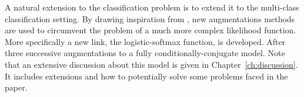 



\graphicspath{{4/figures/}}

A natural extension to the classification problem is to extend it to the multi-class classification setting.
By drawing inspiration from \citet{donner2018efficientdensity}, new augmentations methods are used to circumvent the problem of a much more complex likelihood function.
More specifically a new link, the logistic-softmax function, is developed.
After three successive augmentations to a fully conditionally-conjugate model.
Note that an extensive discussion about this model is given in Chapter~\ref{ch:discussion}.
It includes extensions and how to potentially solve some problems faced in the paper.


